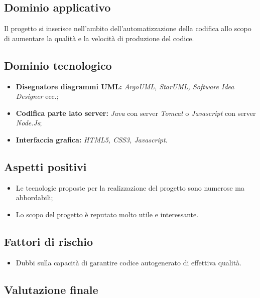\documentclass[openany,12pt,a4paper]{report}
\begin{document}
	\subsection{Dominio applicativo}
	
	Il progetto si inserisce nell'ambito dell'automatizzazione della codifica allo scopo di aumentare la qualità e la velocità di produzione del codice.
	
	\subsection{Dominio tecnologico}
	
	\begin{itemize}
		\item \textbf{Disegnatore diagrammi UML:} \textit{ArgoUML, StarUML, Software Idea Designer} ecc.;
		
		\item \textbf{Codifica parte lato server:} \textit{Java} con server \textit{Tomcat} o \textit{Javascript} con server \textit{Node.Js};
		
		\item \textbf{Interfaccia grafica:} \textit{HTML5, CSS3, Javascript}.
	\end{itemize}
	
	\subsection{Aspetti positivi}
	
	\begin{itemize}
		\item Le tecnologie proposte per la realizzazione del progetto sono numerose ma abbordabili;
		
		\item Lo scopo del progetto è reputato molto utile e interessante.
	\end{itemize}
	
	\subsection{Fattori di rischio}
	
	\begin{itemize}
		\item Dubbi sulla capacità di garantire codice autogenerato di effettiva qualità.
	\end{itemize}
	
	\subsection{Valutazione finale}
	
\end{document}
